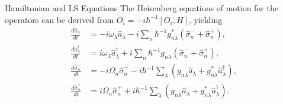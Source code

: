 \documentclass{beamer}
\begin{document}
\begin{frame}{Hamiltonian and LS Equations}
The Heisenberg equations of motion for the operators can be derived from  $\dot { O}_i = -i{\hbar^{-1}[ O_i,H]}$,
yielding
\begin{align}
\frac{d\hat{a}_\lambda}{dt}&=-i\omega_\lambda \hat{a}_\lambda-i\sum_n\hbar^{-1}g_{n\lambda}^*(\hat{\sigma}_n^-+\hat{\sigma}_n^+), \label{eq:a-t}\\
%
\frac{d\hat{a}_\lambda^\dagger}{dt}&=i\omega_\lambda \hat{a}_\lambda^\dagger+i\sum_n\hbar^{-1}g_{n\lambda}(\hat{\sigma}_n^-+\hat{\sigma}_n^+), \label{eq:a+t}\\
%
\frac{d\hat{\sigma}_n^-}{dt}&=-i\Omega_n\hat{\sigma}^-_n-i\hbar^{-1}\sum_{\lambda}(g_{n\lambda}
\hat{a}_\lambda+g_{n\lambda}^*\hat{a}_\lambda^\dagger), \label{eq:sig-t} \\
%
\frac{d\hat{\sigma}_n^+}{dt}&=i\Omega_n\hat{\sigma}^+_n+i\hbar^{-1}\sum_{\lambda}(g_{n\lambda}
\hat{a}_\lambda+g_{n\lambda}^*\hat{a}_\lambda^\dagger). \label{eq:sig+t}
%
\end{align}
\end{frame}
\end{document}

